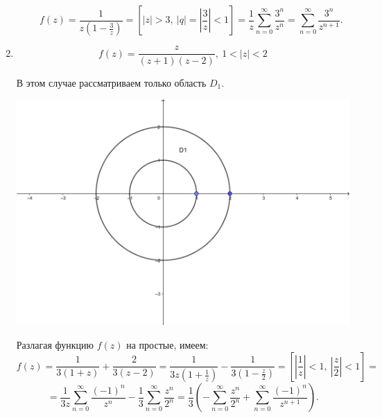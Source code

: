 \documentclass[../../main.tex]{subfiles}
\begin{document}
\begin{exmps}
\begin{enumerate}
\begin{enumerate}
			\[ f(z) = \frac{1}{z(1 - \frac{3}{z})} = \left[ |z| > 3,\ |q| = 
			\left|\frac{3}{z}\right| < 1 \right] = \frac{1}{z} \sum\limits_{n = 
			0}^{\infty} 
			\frac{3^n}{z^n} = \sum\limits_{n = 0}^{\infty} \frac{3^n}{z^{n + 1}}. \]
		\end{enumerate}
	
		\item \[ f(z) = \frac{z}{(z + 1)(z - 2)},\ 1 < |z| < 2 \]
		
		В этом случае рассматриваем только область $ D_1 $.
		\begin{center}
			\includegraphics[scale = 1]{lec34_2} 
		\end{center}
	
		Разлагая функцию $ f(z) $ на простые, имеем:
		\[ f(z) = \frac{1}{3(1 + z)} + \frac{2}{3(z - 2)} = \frac{1}{3z(1 + 
		\frac{1}{z})} - \frac{1}{3(1 - \frac{z}{2})} = \left[ 
		\left|\frac{1}{z}\right| < 1,\ 
		\left|\frac{z}{2}\right| < 1 \right] = \]
		\[ = \frac{1}{3z} \sum\limits_{n = 0}^{\infty} \frac{(-1)^n}{z^n} - 
		\frac{1}{3} \sum\limits_{n = 0}^{\infty} \frac{z^n}{2^n} = \frac{1}{3} 
		\left( -\sum\limits_{n = 0}^{\infty} \frac{z^n}{2^n} + \sum\limits_{n = 
		0}^{\infty} \frac{(-1)^n}{z^{n + 1}} \right). \]
	\end{enumerate}
\end{exmps}
\end{document}
